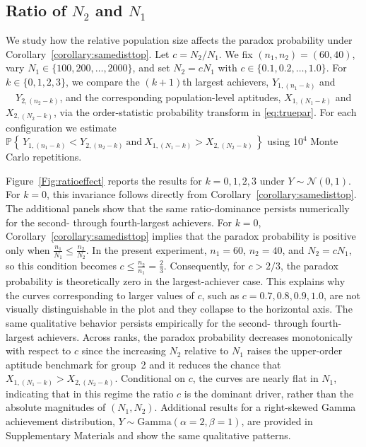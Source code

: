 \documentclass[12pt]{article}
\begin{document}
\subsection{Ratio of $N_2$ and $N_1$}\label{sec:ratioeffect}

We study how the relative population size affects the paradox probability under Corollary~\ref{corollary:samedisttop}. Let $c=N_2/N_1$. We fix $(n_1,n_2)=(60,40)$, vary $N_1\in\{100,200,\ldots,2000\}$, and set $N_2=cN_1$ with $c\in\{0.1,0.2,\ldots,1.0\}$. For $k\in\{0,1,2,3\}$, we compare the $(k+1)$th largest achievers, $Y_{1,(n_1-k)}$ and $\quad Y_{2,(n_2-k)}$, and the corresponding population-level aptitudes, $X_{1,(N_1-k)}$ and $X_{2,(N_2-k)}$, via the order-statistic probability transform in \eqref{eq:truepar}. For each configuration we estimate
$
\mathbb{P}\!\left\{\,Y_{1,(n_1-k)}<Y_{2,(n_2-k)}\ \text{and}\ X_{1,(N_1-k)}>X_{2,(N_2-k)}\,\right\}
$
using $10^4$ Monte Carlo repetitions.

Figure~\ref{Fig:ratioeffect} reports the results for $k=0,1,2,3$ under $Y\sim\mathcal N(0,1)$. For $k=0$, this invariance follows directly from Corollary~\ref{corollary:samedisttop}. The additional panels show that the same ratio-dominance persists numerically for the second- through fourth-largest achievers. For \(k=0\), Corollary~\ref{corollary:samedisttop} implies that the paradox probability is positive only when
$
\frac{n_1}{N_1}\leq \frac{n_2}{N_2}.
$
In the present experiment, \(n_1=60\), \(n_2=40\), and \(N_2=cN_1\), so this condition becomes
$
c\leq \frac{n_2}{n_1}=\frac{2}{3}.
$
Consequently, for \(c>2/3\), the paradox probability is theoretically zero in the largest-achiever case. This explains why the curves corresponding to larger values of \(c\), such as \(c=0.7,0.8,0.9,1.0\), are not visually distinguishable in the plot and they collapse to the horizontal axis. The same qualitative behavior persists empirically for the second- through fourth-largest achievers. Across ranks, the paradox probability decreases monotonically with respect to $c$ since the increasing $N_2$ relative to $N_1$ raises the upper-order aptitude benchmark for group~2 and it reduces the chance that $X_{1,(N_1-k)}>X_{2,(N_2-k)}$. Conditional on $c$, the curves are nearly flat in $N_1$, indicating that in this regime the ratio $c$ is the dominant driver, rather than the absolute magnitudes of $(N_1,N_2)$. Additional results for a right-skewed Gamma achievement distribution, $Y \sim \mathrm{Gamma}(\alpha = 2, \beta = 1)$, are provided in Supplementary Materials and show the same qualitative patterns. 
\end{document}
